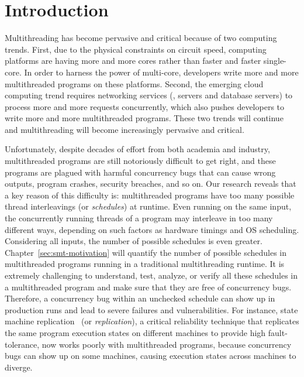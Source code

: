 \chapter{Introduction} \label{sec:intro}

Multithreading has become pervasive and critical because of two computing
trends. First, due to the physical constraints on circuit speed, computing
platforms are having more and more cores rather than faster and faster
single-core. In order to harness the power of multi-core, developers write more
and more multithreaded programs on these platforms. Second, the emerging cloud
computing trend requires networking services (\eg, \http servers and database
servers) to process more and more requests concurrently, which also pushes
developers to write more and more multithreaded programs. These two trends will
continue and multithreading will become increasingly pervasive and critical.

Unfortunately, despite decades of effort from both academia and industry,
multithreaded programs are still notoriously difficult to get right, and these
programs are plagued with harmful concurrency bugs that can cause wrong outputs,
program crashes, security breaches, and so on. Our research reveals that a key
reason of this difficulty is: multithreaded programs have too many
possible thread interleavings (or \emph{schedules}) at runtime. Even running on 
the same input, the concurrently running threads of a program may interleave in 
too many different ways, depending on such factors as hardware timings and OS
scheduling. Considering all inputs, the number of possible schedules is even
greater. Chapter~\ref{sec:smt-motivation} will quantify the number of
possible schedules in multithreaded programs running in a traditional
multithreading runtime. It is extremely challenging to understand, test, 
analyze, or verify all these schedules in a multithreaded program and 
make sure that they are free of concurrency bugs. Therefore, a concurrency bug 
within an unchecked schedule can show up in production runs and lead to severe 
failures and vulnerabilities. For instance, state machine 
replication~\cite{paxos:practical} (or \emph{replication}), a critical 
reliability technique that replicates the same program execution states on 
different machines to provide high fault-tolerance, now works poorly with 
multithreaded programs, because concurrency bugs can show up on some machines, 
causing execution states across machines to diverge.

